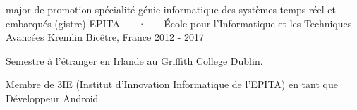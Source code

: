 

\begin{cventries}

  \cventry
    {major de promotion spécialité génie informatique des systèmes temps réel et embarqués (gistre)} %
    {EPITA ~~~·~~~ École pour l'Informatique et les Techniques Avancées} %
    {Kremlin Bicêtre, France} %
    {2012 - 2017} %
    {
      \begin{cvitems} %
        \item {Semestre à l'étranger en Irlande au Griffith College Dublin.}
        \item {Membre de 3IE (Institut d'Innovation Informatique de l'EPITA) en tant que Développeur Android}
      \end{cvitems}
    }

\end{cventries}
